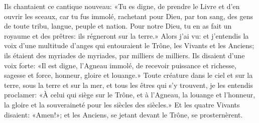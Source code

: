 Ils chantaient ce cantique nouveau:
	«Tu es digne, de prendre le Livre et d’en ouvrir les sceaux,
	car tu fus immolé, rachetant pour Dieu, par ton sang,
	des gens de toute tribu, langue, peuple et nation.
Pour notre Dieu, tu en as fait un royaume et des prêtres:
	ils régneront sur la terre.»
Alors j’ai vu:
	et j’entendis la voix d’une multitude d’anges qui entouraient le Trône,
		les Vivants et les Anciens;
	ils étaient des myriades de myriades, par milliers de milliers.
Ils disaient d’une voix forte:
	«Il est digne, l’Agneau immolé,
	de recevoir puissance et richesse, sagesse et force,
	honneur, gloire et louange.»
Toute créature dans le ciel et sur la terre, sous la terre et sur la mer,
	et tous les êtres qui s’y trouvent, je les entendis proclamer:
	«À celui qui siège sur le Trône, et à l’Agneau,
	la louange et l’honneur, la gloire et la souveraineté
	pour les siècles des siècles.»
Et les quatre Vivants disaient: «Amen!»;
	et les Anciens, se jetant devant le Trône, se prosternèrent.
